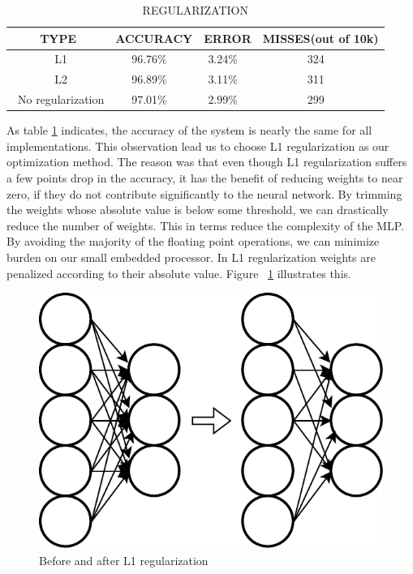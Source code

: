 \documentclass[sigconf]{acmart}
\theoremstyle{plain}
\theoremstyle{remark}
\begin{document}
\begin{table} [H] 
\centering
\caption{REGULARIZATION} \label{tab:regularization}
\begin{minipage}[b]{\linewidth}
\renewcommand{\arraystretch}{0.6}
\addtolength{\tabcolsep}{-2.7pt}
\renewcommand{\thefootnote}{\thempfootnote}
\renewcommand{\thempfootnote}{\fnsymbol{mpfootnote}}
\begin{center}
\begin{tabular}{ c | c | c | c }
 \textbf {TYPE} & \textbf{ACCURACY} & \textbf{ERROR} & \textbf {MISSES(out of 10k)}\\
\midrule
\midrule
\ L1    &    96.76\%  \ &    3.24\% \ & 324      \ \\
\ L2    &    96.89\%  \ &    3.11\% \ & 311      \ \\
\ No regularization    &    97.01\%   \ &    2.99\% \ & 299      \ \\
\end{tabular}
\end{center}
\end{minipage}
\end{table}

As table \ref{tab:regularization} indicates, the accuracy of the system is nearly the same for all implementations. This observation lead us to choose L1 regularization as our optimization method. The reason was that even though L1 regularization suffers a few points drop in the accuracy, it has the benefit of reducing weights to near zero, if they do not contribute significantly to the neural network. By trimming the weights whose absolute value is below some threshold, we can drastically reduce the number of weights. This in terms reduce the complexity of the MLP. By avoiding the majority of the floating point operations, we can minimize burden on our small embedded processor. In L1 regularization weights are penalized according to their absolute value. Figure ~\ref{fig:regularization} illustrates this.

\begin{figure} [H]
\centering
\includegraphics[width=.4\linewidth]{regularization.pdf}
\caption{Before and after L1 regularization}
\label{fig:regularization}
\end{figure}
\end{document}
